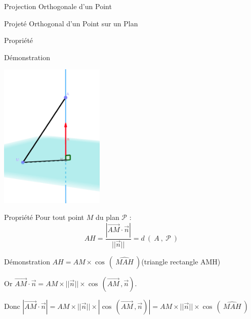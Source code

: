 \documentclass{cours}
\begin{document}
\begin{Gpartie}{Projection Orthogonale d'un Point}
\begin{Spartie}{Projeté Orthogonal d'un Point sur un Plan}
\begin{SSSpartie}{Propriété}
\begin{SSSSpartie}{Démonstration}
                    \begin{center}
                        \includegraphics[width=5cm]{rsc/12fig9.png}
                        \parbox{\linewidth}{}
                    \end{center}    
                \end{SSSSpartie}
            \end{SSSpartie}
            \begin{SSSpartie}{Propriété} 
                Pour tout point $M$ du plan $\mathcal{P}$ : \[AH=\frac{\left\lvert\overrightarrow{AM}\cdot\vec{n}\right\rvert}{\lvert\lvert\vec{n}\rvert\rvert}=d~\left(~A~,~\mathcal{P}~\right)\]
                \begin{SSSSpartie}{Démonstration} 
                    $AH=AM\times\cos\,\left(~\widehat{MAH}~\right)$\quad (triangle rectangle AMH)

                    Or $\overrightarrow{AM}\cdot\vec{n}=AM\times\lvert\lvert\vec{n}\rvert\rvert\times\cos\,\left(\overrightarrow{AM}\,,\vec{n}\right)$.

                    Donc $\left\lvert\overrightarrow{AM}\cdot\vec{n}\right\rvert=AM\times\lvert\lvert\vec{n}\rvert\rvert\times\left\lvert\cos\,\left(\overrightarrow{AM}\,, \vec{n}\right)\right\rvert=AM\times\lvert\lvert\vec{n}\rvert\rvert\times\cos\,\left(~\widehat{MAH}~\right)$


\end{SSSSpartie}
\end{SSSpartie}
\end{Spartie}
\end{Gpartie}
\end{document}
